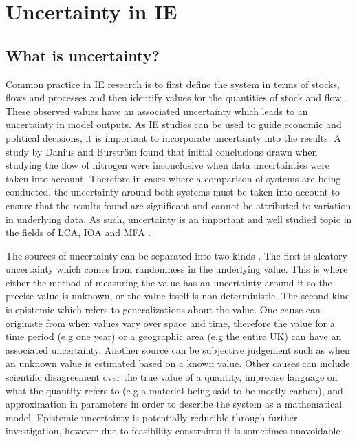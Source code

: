 \documentclass[ %
                    author={Tom Jager},
                supervisor={Dr. Daniel Schien},
                    degree={MEng},
                     title={A Bayesian Inference Engine for UMIS Structured Data},
                  subtitle={},
                      type={research},
                      year={2019} ]{dissertation}
\begin{document}
\section{Uncertainty in IE}
\subsection{What is uncertainty?}
Common practice in IE research is to first define the system in terms of stocks, flows and processes and then identify values for the quantities of stock and flow. These observed values have an associated uncertainty which leads to an uncertainty in model outputs. As IE studies can be used to guide economic and political decisions, it is important to incorporate uncertainty into the results. A study by Danius and Burstr\"om \cite{danius2001regional} found that initial conclusions drawn when studying the flow of nitrogen were inconclusive when data uncertainties were taken into account. Therefore in cases where a comparison of systems are being conducted, the uncertainty around both systems must be taken into account to ensure that the results found are significant and cannot be attributed to variation in underlying data. As such, uncertainty is an important and well studied topic in the fields of LCA, IOA and MFA \cite{temursho201712, laner2014systematic, heijungs2004review}.

The sources of uncertainty can be separated into two kinds \cite{ferson1996different}. The first is aleatory uncertainty which comes from randomness in the underlying value. This is where either the method of measuring the value has an uncertainty around it so the precise value is unknown, or the value itself is non-deterministic. The second kind is epistemic which refers to generalizations about the value. One cause can originate from when values vary over space and time, therefore the value for a time period (e.g one year) or a geographic area (e.g the entire UK) can have an associated uncertainty. Another source can be subjective judgement such as when an unknown value is estimated based on a known value. Other causes can include scientific disagreement over the true value of a quantity, imprecise language on what the quantity refers to (e.g a material being said to be mostly carbon), and approximation in parameters in order to describe the system as a mathematical model. Epistemic uncertainty is potentially reducible through further investigation, however due to feasibility constraints it is sometimes unavoidable \cite{laner2014systematic}.
\end{document}
